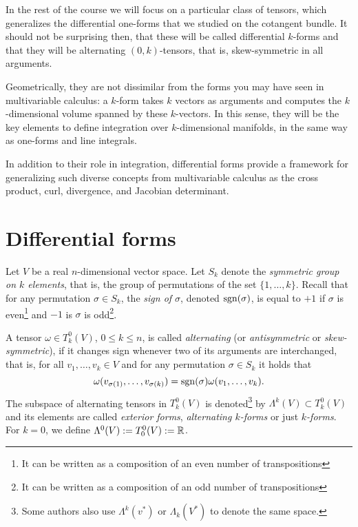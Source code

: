 In the rest of the course we will focus on a particular class of tensors, which generalizes the differential one-forms that we studied on the cotangent bundle.
It should not be surprising then, that these will be called differential $k$-forms and that they will be alternating $(0,k)$-tensors, that is, skew-symmetric in all arguments.

Geometrically, they are not dissimilar from the forms you may have seen in multivariable calculus: a $k$-form takes $k$ vectors as arguments and computes the $k$-dimensional volume spanned by these $k$-vectors.
In this sense, they will be the key elements to define integration over $k$-dimensional manifolds, in the same way as one-forms and line integrals.

In addition to their role in integration, differential forms provide a framework for generalizing such diverse concepts from multivariable calculus as the cross product, curl, divergence, and Jacobian determinant. 

\section{Differential forms}

\begin{definition}
  Let $V$ be a real $n$-dimensional vector space.
  Let $S_k$ denote the \emph{symmetric group on $k$ elements}, that is, the group of permutations of the set $\{1,\ldots,k\}$.
  Recall that for any permutation $\sigma\in S_k$, the \emph{sign of $\sigma$}, denoted $\operatorname{sgn}(\sigma)$, is equal to $+1$ if $\sigma$ is even\footnote{It can be written as a composition of an even number of transpositions} and $-1$ is $\sigma$ is odd\footnote{It can be written as a composition of an odd number of transpositions}.

  A tensor $\omega\in T_k^0(V)$, $0\leq k\leq n$, is called \emph{alternating} (or \emph{antisymmetric} or \emph{skew-symmetric}), if it changes sign whenever two of its arguments are interchanged, that is,
  for all $v_1, \ldots, v_k\in V$ and for any permutation $\sigma\in S_k$ it holds that
  \begin{equation}
    \omega(v_{\sigma(1)}, \ldots, v_{\sigma(k)}) = \operatorname{sgn}(\sigma) \omega(v_1, \ldots, v_k).
  \end{equation}
  The subspace of alternating tensors in $T_k^0(V)$ is denoted\footnote{Some authors also use $\Lambda^k(v^*)$ or $\Lambda_k(V^*)$ to denote the same space.} by $\Lambda^k(V) \subset T_k^0(V)$ and its elements are called \emph{exterior forms}, \emph{alternating $k$-forms} or just  \emph{$k$-forms}.
  For $k=0$, we define $\Lambda^0(V) := T_0^0(V) := \mathbb{R}$.
\end{definition} 

